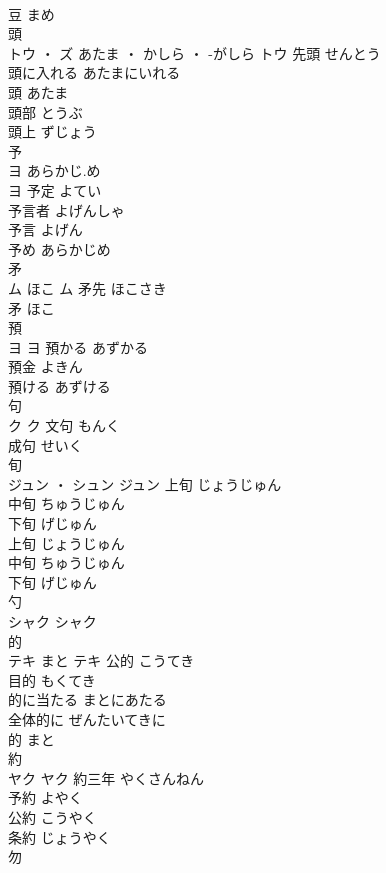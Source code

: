 \documentclass[8pt]{extreport}
\begin{document}
\begin{CJK}{UTF8}{min}
\\	豆	まめ	
\\	頭	
\\	トウ ・ ズ	あたま ・ かしら ・ -がしら	トウ	先頭	せんとう	
\\	頭に入れる	あたまにいれる	
\\	頭	あたま	
\\	頭部	とうぶ	
\\	頭上	ずじょう	
\\	予	
\\	ヨ	あらかじ.め
\\	ヨ	予定	よてい	
\\	予言者	よげんしゃ	
\\	予言	よげん	
\\	予め	あらかじめ	
\\	矛	
\\	ム	ほこ	ム	矛先	ほこさき	
\\	矛	ほこ	
\\	預	
\\	ヨ		ヨ	預かる	あずかる	
\\	預金	よきん	
\\	預ける	あずける	
\\	句	
\\	ク		ク	文句	もんく	
\\	成句	せいく	
\\	旬	
\\	ジュン ・ シュン		ジュン	上旬	じょうじゅん	
\\	中旬	ちゅうじゅん	
\\	下旬	げじゅん	
\\	上旬	じょうじゅん	
\\	中旬	ちゅうじゅん	
\\	下旬	げじゅん	
\\	勺	
\\	シャク		シャク																																			
\\	的	
\\	テキ	まと	テキ	公的	こうてき	
\\	目的	もくてき	
\\	的に当たる	まとにあたる	
\\	全体的に	ぜんたいてきに	
\\	的	まと	
\\	約	
\\	ヤク		ヤク	約三年	やくさんねん	
\\	予約	よやく	
\\	公約	こうやく	
\\	条約	じょうやく	
\\	勿	

\end{CJK}
\end{document}
